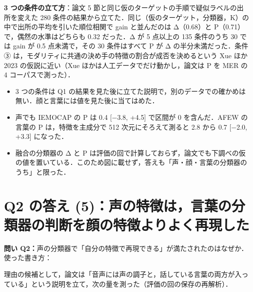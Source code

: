 \documentclass[a4paper,10pt]{ltjsarticle}
\newcommand{\toihead}[4][]{\begin{headbar}[#2]\textbf{\textcolor{#2}{問い #3：}}#4\if\relax\detokenize{#1}\relax\else\hfill{\small 使った書き方：}#1\fi\end{headbar}}
\newcommand{\pagesection}[1]{\clearpage\section{#1}}
\begin{document}
\noindent\textbf{3 つの条件の立て方}：論文 5 節と同じ仮のターゲットの手順で疑似ラベルの出所を変えた 280 条件の結果から立てた．同じ（仮のターゲット，分類器，K）の中で出所の平均を引いた順位相関で gain と並んだのは Δ（0.68）と P（0.71）で，偶然の水準はどちらも 0.32 だった．Δ が 5 点以上の 135 条件のうち 30 では gain が 0.5 点未満で，その 30 条件はすべて P が Δ の半分未満だった．条件 ③ は，モダリティに共通の決め手の特徴の割合が成否を決めるという Xue ほか 2023 の仮説に近い（Xue ほかは人工データでだけ動かし，論文は P を MER の 4 コーパスで測った）．

\begin{yowai}
\begin{itemize}
  \item 3 つの条件は Q1 の結果を見た後に立てた説明で，別のデータでの確かめは無い．顔と言葉には値を見た後に当てはめた．
  \item 声でも IEMOCAP の P は 0.4 [−3.8, +4.5] で区間が 0 を含んだ．AFEW の言葉の P は，特徴を主成分で 512 次元にそろえて測ると 2.8 から 0.7 [−2.0, +3.3] になった．
  \item 融合の分類器の Δ と P は評価の回で計算しておらず，論文でも下調べの仮の値を置いている．このため図に載せず，答えも「声・顔・言葉の分類器のうち」と限った．
\end{itemize}
\end{yowai}

\pagesection{Q2 の答え (5)：声の特徴は，言葉の分類器の判断を顔の特徴よりよく再現した}\label{sec:q2voice}
\toihead{cQ2}{Q2}{声の分類器で「自分の特徴で再現できる」が満たされたのはなぜか．}

\noindent 理由の候補として，論文は「音声には声の調子と，話している言葉の両方が入っている」という説明を立て，次の量を測った（評価の回の保存の再解析）．
\end{document}
